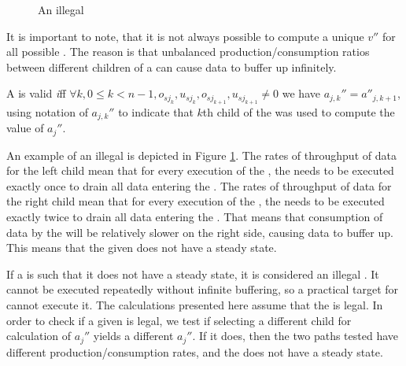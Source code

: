 \begin{figure}\begin{center}
\begin{minipage}{1in}
\centering {}
\end{minipage}
\end{center}
\caption{An illegal {\splitjoin}} \label{fig:splitjoin-illegal}
\end{figure}

It is important to note, that it is not always possible to compute
a unique $v''$ for all possible {\splitjoins}. The reason is that
unbalanced production/consumption ratios between different
children of a {\splitjoin} can cause data to buffer up infinitely.

\begin{definition} A {\splitjoin} is valid
{\emph iff} $\forall k, 0 \le k < n-1, o_{sj_k}, u_{sj_k},
o_{sj_{k+1}}, u_{sj_{k+1}} \ne 0$ we have $a_{j,k}'' =
a''_{j,k+1}$, using notation of $a_{j,k}''$ to indicate that $k$th
child of the {\splitjoin} was used to compute the value of
$a_j''$.
\end{definition}

An example of an illegal {\splitjoin} is depicted in Figure
\ref{fig:splitjoin-illegal}.  The rates of throughput of data for
the left child mean that for every execution of the {\splitter},
the {\joiner} needs to be executed exactly once to drain all data
entering the {\splitjoin}.  The rates of throughput of data for
the right child mean that for every execution of the {\splitter},
the {\joiner} needs to be executed exactly twice to drain all data
entering the {\splitjoin}. That means that consumption of data by
the {\joiner} will be relatively slower on the right side, causing
data to buffer up. This means that the given {\splitjoin} does not
have a steady state.

If a {\splitjoin} is such that it does not have a steady state, it
is considered an illegal {\splitjoin}.  It cannot be executed
repeatedly without infinite buffering, so a practical target for
{\StreamIt} cannot execute it.  The calculations presented here
assume that the {\splitjoin} is legal.  In order to check if a
given {\splitjoin} is legal, we test if selecting a different
child for calculation of $a_j''$ yields a different $a_j''$. If it
does, then the two paths tested have different
production/consumption rates, and the {\splitjoin} does not have a
steady state.

\subsection{{\feedbackloop}}

